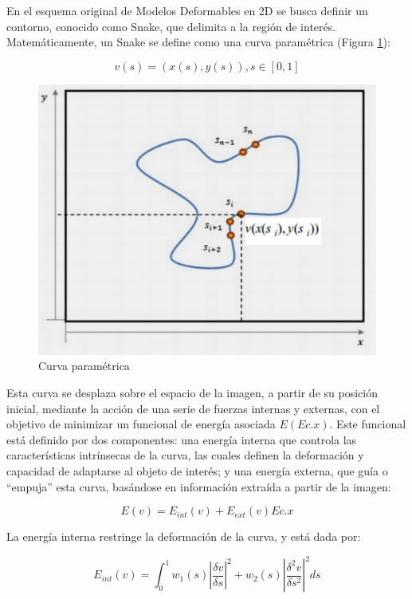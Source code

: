 En el esquema original de Modelos Deformables en 2D se busca definir un contorno, conocido como Snake, que delimita a la región de interés. Matemáticamente, un Snake se define como una curva paramétrica (Figura \ref{fig:curva_parametrica}):

$$ v(s) = (x(s), y(s)), s \in [0,1] $$

\begin{figure}[H]
	\centering
	\includegraphics[scale=0.05]{images/grafico_snake_parametrico.jpg}
	\caption{Curva paramétrica}
	\label{fig:curva_parametrica}
\end{figure}

Esta curva se desplaza sobre el espacio de la imagen, a partir de su posición inicial, mediante la acción de una serie de fuerzas internas y externas, con el objetivo de minimizar un funcional de energía asociada $E(Ec.x)$. Este funcional está definido por dos componentes: una energía interna que controla las características intrínsecas de la curva, las cuales definen la deformación y capacidad de adaptarse al objeto de interés; y una energía externa, que guía o “empuja” esta curva, basándose en información extraída a partir de la imagen:

$$ E(v) = E_{int}(v) + E_{ext}(v) Ec.x $$

La energía interna restringe la deformación de la curva, y está dada por:

$$ E_{int}(v) = \int_{0}^{1} w_{1}(s) \left| \dfrac{\delta v}{\delta s} \right|^{2} + w_{2}(s) \left|\dfrac{\delta^{2}v}{\delta s^2} \right|^{2} ds $$

